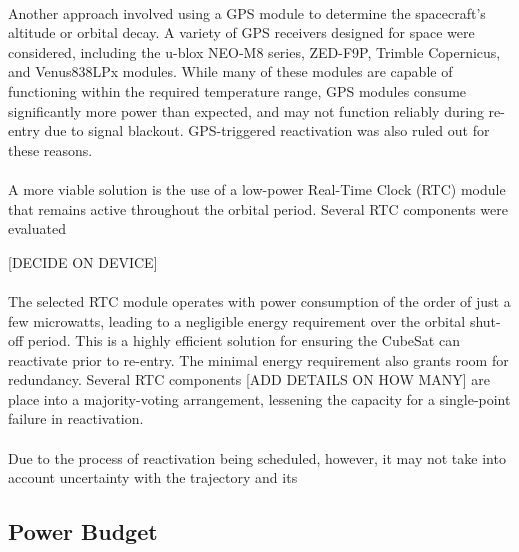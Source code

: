 \documentclass[11pt]{article}
\begin{document}
	\paragraph{}Another approach involved using a GPS module to determine the spacecraft’s altitude or orbital decay. A variety of GPS receivers designed for space were considered, including the u-blox NEO-M8 series, ZED-F9P, Trimble Copernicus, and Venus838LPx modules. While many of these modules are capable of functioning within the required temperature range, GPS modules consume significantly more power than expected, and may not function reliably during re-entry due to signal blackout. GPS-triggered reactivation was also ruled out for these reasons.
	
	\paragraph{}A more viable solution is the use of a low-power Real-Time Clock (RTC) module that remains active throughout the orbital period. Several RTC components were evaluated
	
	[DECIDE ON DEVICE]
	
	
	
	\paragraph{}The selected RTC module operates with power consumption of the order of just a few microwatts, leading to a negligible energy requirement over the orbital shut-off period. This is a highly efficient solution for ensuring the CubeSat can reactivate prior to re-entry. The minimal energy requirement also grants room for redundancy. Several RTC components [ADD DETAILS ON HOW MANY] are place into a majority-voting arrangement, lessening the capacity for a single-point failure in reactivation.
	
	\paragraph{}Due to the process of reactivation being scheduled, however, it may not take into account uncertainty with the trajectory and its
	
	\paragraph{}
	
	\subsection{Power Budget}
	
\end{document}
